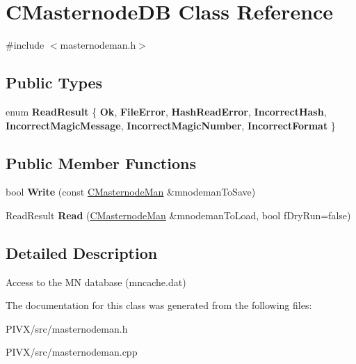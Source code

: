 \hypertarget{class_c_masternode_d_b}{}\section{C\+Masternode\+DB Class Reference}
\label{class_c_masternode_d_b}


{\ttfamily \#include $<$masternodeman.\+h$>$}

\subsection*{Public Types}
\begin{DoxyCompactItemize}
\item 
\mbox{\label{class_c_masternode_d_b_a560dac33848fa407bf7e66f26b08e721}} 
enum {\bfseries Read\+Result} \{ \newline
{\bfseries Ok}, 
{\bfseries File\+Error}, 
{\bfseries Hash\+Read\+Error}, 
{\bfseries Incorrect\+Hash}, 
\newline
{\bfseries Incorrect\+Magic\+Message}, 
{\bfseries Incorrect\+Magic\+Number}, 
{\bfseries Incorrect\+Format}
 \}
\end{DoxyCompactItemize}
\subsection*{Public Member Functions}
\begin{DoxyCompactItemize}
\item 
\mbox{\label{class_c_masternode_d_b_a6833edd9800df785eb6f9c3a1e7d63c4}} 
bool {\bfseries Write} (const \mbox{\hyperlink{class_c_masternode_man}{C\+Masternode\+Man}} \&mnodeman\+To\+Save)
\item 
\mbox{\label{class_c_masternode_d_b_affb4fe075566e13a6aac4f1ba7ee2b95}} 
Read\+Result {\bfseries Read} (\mbox{\hyperlink{class_c_masternode_man}{C\+Masternode\+Man}} \&mnodeman\+To\+Load, bool f\+Dry\+Run=false)
\end{DoxyCompactItemize}


\subsection{Detailed Description}
Access to the MN database (mncache.\+dat) 

The documentation for this class was generated from the following files\+:\begin{DoxyCompactItemize}
\item 
P\+I\+V\+X/src/masternodeman.\+h\item 
P\+I\+V\+X/src/masternodeman.\+cpp\end{DoxyCompactItemize}
